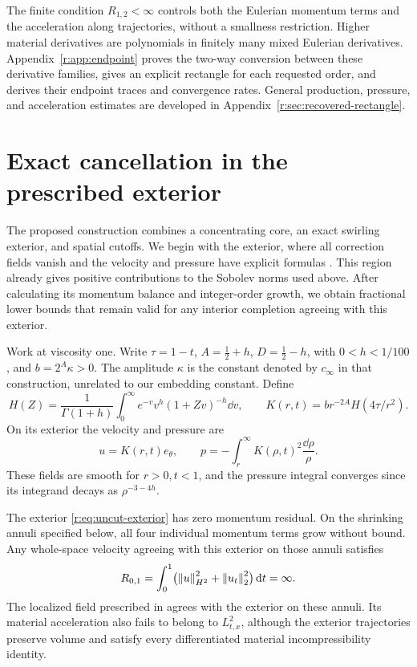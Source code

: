 The finite condition \(R_{1,2}<\infty\) controls both the Eulerian
momentum terms and the acceleration along trajectories, without a
smallness restriction. Higher material derivatives are polynomials
in finitely many mixed Eulerian derivatives. Appendix~\ref{r:app:endpoint}
proves the two-way conversion between these derivative families,
gives an explicit rectangle for each requested order, and derives
their endpoint traces and convergence rates. General production,
pressure, and acceleration estimates are developed in
Appendix~\ref{r:sec:recovered-rectangle}.

\section{Exact cancellation in the prescribed exterior}
\label{r:sec:exact-cancellation}

The proposed construction combines a concentrating core, an exact
swirling exterior, and spatial cutoffs. We begin with the exterior,
where all correction fields vanish and the velocity and pressure have
explicit formulas \cite[p.~116, Step~4; p.~138, Lemma~A.6]{openai-paper}.
This region already gives positive contributions to the Sobolev norms
used above. After calculating its momentum balance and integer-order
growth, we obtain fractional lower bounds that remain valid for any
interior completion agreeing with this exterior.

Work at viscosity one. Write
\(\tau=1-t\), \(A=\tfrac12+h\), \(D=\tfrac12-h\), with
\(0<h<1/100\), and \(b=2^A\kappa>0\).
The amplitude \(\kappa\) is the constant denoted by \(c_\infty\) in
that construction, unrelated to our embedding constant. Define
\begin{equation}
 H(Z)=\frac1{\Gamma(1+h)}\int_0^\infty
 e^{-v}v^h(1+Zv)^{-h}\dd v,
 \qquad K(r,t)=b r^{-2A}H(4\tau/r^2).
 \label{r:eq:heat-integral}
\end{equation}
On its exterior the velocity and pressure are
\begin{equation}
 u=K(r,t)e_\theta,\qquad
 p=-\int_r^\infty K(\rho,t)^2\frac{\dd\rho}{\rho}.
 \label{r:eq:uncut-exterior}
\end{equation}
These fields are smooth for \(r>0,t<1\), and the pressure integral
converges since its integrand decays as \(\rho^{-3-4h}\).

\begin{proposition}
\label{r:prop:exterior-cancellation}
The exterior \eqref{r:eq:uncut-exterior} has zero momentum residual.
On the shrinking annuli specified below, all four individual momentum
terms grow without bound. Any whole-space velocity agreeing with this
exterior on those annuli satisfies
\[
 R_{0,1}=\int_0^1
 \bigl(\left\lVert u\right\rVert_{H^2}^2+\left\lVert u_t\right\rVert_2^2\bigr)\,\mathrm d t=\infty.
\]
The localized field prescribed in \cite{openai-paper} agrees with the
exterior on these annuli.
Its material acceleration also fails to belong to \(L^2_{t,x}\), although
the exterior trajectories preserve volume and satisfy every differentiated
material incompressibility identity.
\end{proposition}


